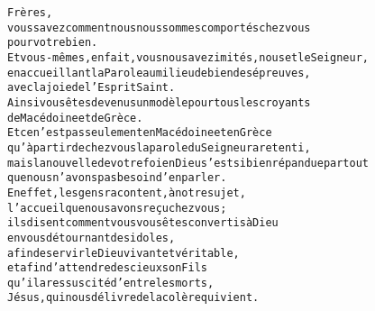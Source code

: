 \documentclass[RG2023_CarnetCommun.tex]{subfiles}
\begin{document}




\begin{alltt}\normalfont
Frères,
    vous savez comment nous nous sommes comportés chez vous
pour votre bien.
    Et vous-mêmes, en fait, vous nous avez imités, nous et le Seigneur,
en accueillant la Parole au milieu de bien des épreuves,
avec la joie de l’Esprit Saint.
    Ainsi vous êtes devenus un modèle pour tous les croyants
de Macédoine et de Grèce.
    Et ce n’est pas seulement en Macédoine et en Grèce
qu’à partir de chez vous la parole du Seigneur a retenti,
mais la nouvelle de votre foi en Dieu s’est si bien répandue partout
que nous n’avons pas besoin d’en parler.
    En effet, les gens racontent, à notre sujet,
l’accueil que nous avons reçu chez vous ;
ils disent comment vous vous êtes convertis à Dieu
en vous détournant des idoles,
afin de servir le Dieu vivant et véritable,
    et afin d’attendre des cieux son Fils
qu’il a ressuscité d’entre les morts,
Jésus, qui nous délivre de la colère qui vient.
\end{alltt}

\end{document}
